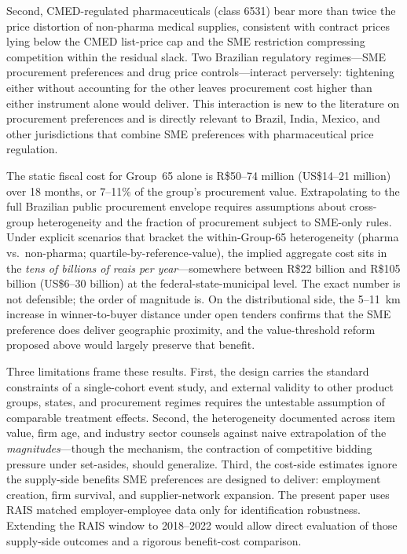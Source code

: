 Second, CMED-regulated pharmaceuticals (class 6531) bear more than twice the price distortion of non-pharma medical supplies, consistent with contract prices lying below the CMED list-price cap and the SME restriction compressing competition within the residual slack. Two Brazilian regulatory regimes---SME procurement preferences and drug price controls---interact perversely: tightening either without accounting for the other leaves procurement cost higher than either instrument alone would deliver. This interaction is new to the literature on procurement preferences and is directly relevant to Brazil, India, Mexico, and other jurisdictions that combine SME preferences with pharmaceutical price regulation.

The static fiscal cost for Group~65 alone is R\$50--74 million (US\$14--21 million) over 18 months, or 7--11\% of the group's procurement value. Extrapolating to the full Brazilian public procurement envelope requires assumptions about cross-group heterogeneity and the fraction of procurement subject to SME-only rules. Under explicit scenarios that bracket the within-Group-65 heterogeneity (pharma vs.\ non-pharma; quartile-by-reference-value), the implied aggregate cost sits in the \emph{tens of billions of reais per year}---somewhere between R\$22 billion and R\$105 billion (US\$6--30 billion) at the federal-state-municipal level. The exact number is not defensible; the order of magnitude is. On the distributional side, the 5--11~km increase in winner-to-buyer distance under open tenders confirms that the SME preference does deliver geographic proximity, and the value-threshold reform proposed above would largely preserve that benefit.

Three limitations frame these results. First, the design carries the standard constraints of a single-cohort event study, and external validity to other product groups, states, and procurement regimes requires the untestable assumption of comparable treatment effects. Second, the heterogeneity documented across item value, firm age, and industry sector counsels against naive extrapolation of the \emph{magnitudes}---though the mechanism, the contraction of competitive bidding pressure under set-asides, should generalize. Third, the cost-side estimates ignore the supply-side benefits SME preferences are designed to deliver: employment creation, firm survival, and supplier-network expansion. The present paper uses RAIS matched employer-employee data only for identification robustness. Extending the RAIS window to 2018--2022 would allow direct evaluation of those supply-side outcomes and a rigorous benefit-cost comparison.

